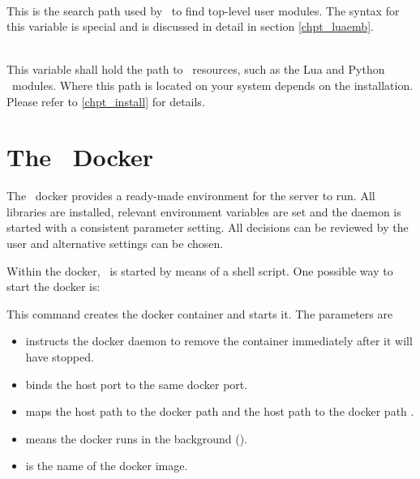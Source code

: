 \begin{minipage}{\textwidth}
\\
This is the search path used by \nowdb\ to find top-level
user modules. The syntax for this variable is special
and is discussed in detail in section \ref{chpt_luaemb}.

\\
This variable shall hold the path to \nowdb\ resources,
such as the Lua and Python \nowdb\ modules. Where this
path is located on your system depends on the installation.
Please refer to \ref{chpt_install} for details.

\section{The \nowdb\ Docker}
The \nowdb\ docker provides a ready-made environment
for the server to run. All libraries are installed,
relevant environment variables are set and the daemon
is started with a consistent parameter setting.
All decisions can be reviewed by the user and alternative
settings can be chosen.

Within the docker, \nowdb\ is started
by means of a shell script.
One possible way to start the docker is:


This command creates the docker container and starts it.
The parameters are
\begin{itemize}
\item {}
instructs the docker daemon to remove
the container immediately after it will have stopped.

\item {} binds the host port 
to the same docker port.

\item {} maps the host path
 to the docker path  and
the host path  to the docker path .

\item {} means the docker runs in the background
().

\item {} is the name of the docker image.


\end{itemize}
\end{minipage}
